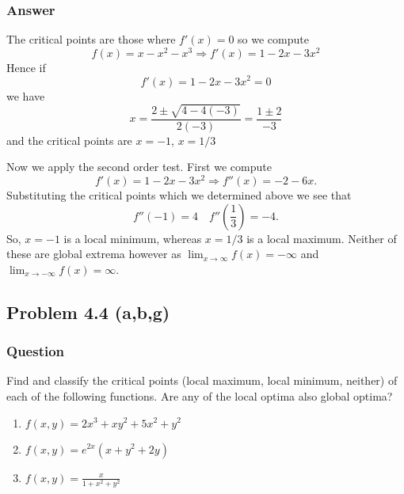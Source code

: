 \documentclass[12pt]{article}
\begin{document}
\subsubsection{Answer}
The critical points are those where $f'(x)=0$ so we compute
\[f(x) = x-x^2-x^3 \Rightarrow f'(x)=1 -2x -3 x ^2\] 
Hence if 
\[ f'(x)=1 -2x -3 x ^2 = 0 \] 
we have
\[x = \frac{2 \pm \sqrt{4-4(-3)}}{2 (-3) } =  \frac{1 \pm 2}{-3} \]
and the critical points are $x= -1$, $x= 1/3$

Now we apply the second order test. First we compute 
\[ f'(x)=1 -2x -3 x ^2 \Rightarrow f''(x)= -2-6x.\] 
Substituting the critical points which we determined above we see that 
\[f''(-1)=4 \quad f''\left(\frac{1}{3}\right)= -4.\]
So, $x=-1$ is a local minimum, whereas $x=1/3$ is a local maximum. Neither of these are global extrema however as $\lim_{x\to \infty}f(x)= -\infty$ and $\lim_{x\to -\infty}f(x)=\infty$.


\subsection{Problem 4.4 (a,b,g)}
\subsubsection{Question}
Find and classify the critical points (local maximum, local minimum, neither) of each of the following functions. Are any of the local optima also global optima?
\begin{enumerate}
\item $f(x,y)=2x^3+ x y ^2+5x^2+y^2$
\item $f(x,y)=e^{2x} (x+y^2+2y)$
\item $f(x,y)= \frac{x}{1+x^2+y^2}$
\end{enumerate}
\end{document}
